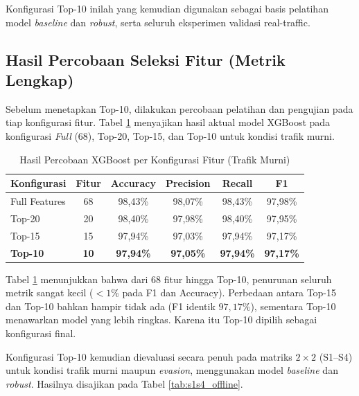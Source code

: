 \documentclass[11pt, a4paper]{article}
\begin{document}
Konfigurasi Top-10 inilah yang kemudian digunakan sebagai basis pelatihan model \textit{baseline} dan \textit{robust}, serta seluruh eksperimen validasi real-traffic.

\subsection{Hasil Percobaan Seleksi Fitur (Metrik Lengkap)}
Sebelum menetapkan Top-10, dilakukan percobaan pelatihan dan pengujian pada tiap konfigurasi fitur. Tabel \ref{tab:ablation_full} menyajikan hasil aktual model XGBoost pada konfigurasi \textit{Full} (68), Top-20, Top-15, dan Top-10 untuk kondisi trafik murni.

\begin{table}[htbp]
\centering
\caption{Hasil Percobaan XGBoost per Konfigurasi Fitur (Trafik Murni)}
\label{tab:ablation_full}
\small
\begin{tabularx}{\linewidth}{@{} l c c c c c @{}}
\toprule
\textbf{Konfigurasi} & \textbf{Fitur} & \textbf{Accuracy} & \textbf{Precision} & \textbf{Recall} & \textbf{F1} \\ \midrule
Full Features & 68 & 98,43\% & 98,07\% & 98,43\% & 97,98\% \\ \addlinespace
Top-20 & 20 & 98,40\% & 97,98\% & 98,40\% & 97,95\% \\ \addlinespace
Top-15 & 15 & 97,94\% & 97,03\% & 97,94\% & 97,17\% \\ \addlinespace
\textbf{Top-10} & \textbf{10} & \textbf{97,94\%} & \textbf{97,05\%} & \textbf{97,94\%} & \textbf{97,17\%} \\ \bottomrule
\end{tabularx}
\end{table}

Tabel \ref{tab:ablation_full} menunjukkan bahwa dari 68 fitur hingga Top-10, penurunan seluruh metrik sangat kecil ($< 1\%$ pada F1 dan Accuracy). Perbedaan antara Top-15 dan Top-10 bahkan hampir tidak ada (F1 identik $97{,}17\%$), sementara Top-10 menawarkan model yang lebih ringkas. Karena itu Top-10 dipilih sebagai konfigurasi final.

Konfigurasi Top-10 kemudian dievaluasi secara penuh pada matriks $2\times 2$ (S1--S4) untuk kondisi trafik murni maupun \textit{evasion}, menggunakan model \textit{baseline} dan \textit{robust}. Hasilnya disajikan pada Tabel \ref{tab:s1s4_offline}.
\end{document}
